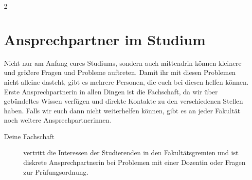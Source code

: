 \begin{multicols}{2}

\section*{Ansprechpartner im Studium}

Nicht nur am Anfang eures Studiums, sondern auch mittendrin können kleinere und größere Fragen und Probleme auftreten. Damit ihr mit diesen Problemen nicht alleine dasteht, gibt es mehrere Personen, die euch bei diesen helfen können. Erste Ansprechpartnerin in allen Dingen ist die Fachschaft, da wir über gebündeltes Wissen verfügen und direkte Kontakte zu den verschiedenen Stellen haben. Falls wir euch dann nicht weiterhelfen können, gibt es an jeder Fakultät noch weitere Ansprechpartnerinnen.


\begin{figure}[t]
	\centering
	\begin{subfigure}{.3\linewidth}
		\ifdefined\studienberatungphysikphoto
		\fi
	\end{subfigure}
	\begin{subfigure}{.22\linewidth}
		\ifdefined\studienberatungmathephoto
		\fi
	\end{subfigure}
	\begin{subfigure}{.3\linewidth}
		\ifdefined\studienberatunginformatikphoto
		\fi
	\end{subfigure}
\end{figure}





\begin{description}
        
    
        
    \item[Deine Fachschaft] vertritt die Interessen der Studierenden in den Fakultätsgremien und ist diskrete Ansprechpartnerin bei Problemen mit einer Dozentin oder Fragen zur Prüfungsordnung.\\ 
    

\end{description}
\end{multicols}
